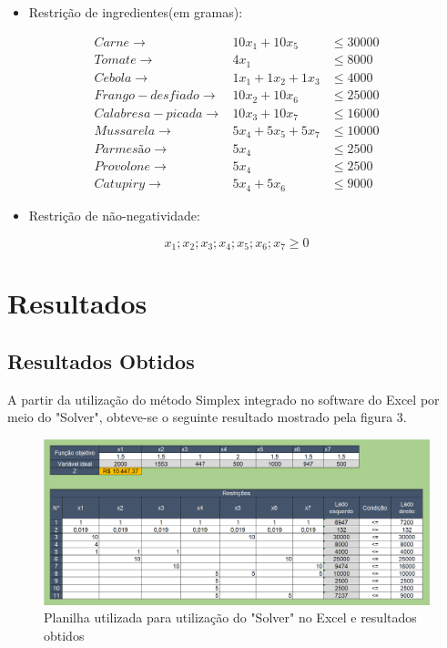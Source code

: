 \documentclass[
	12pt,				%
	openright,			%
	oneside,			%
	a4paper,			%
	english,			%
	french,				%
	spanish,			%
	brazil				%
	]{abntex2}
\begin{document}
\begin{itemize}
\item Restrição de ingredientes(em gramas):
\end{itemize}
\begin{eqnarray}
Carne \to & 10x_1 + 10x_5 & \leq 30000\\
Tomate \to &  4x_1 & \leq 8000\\
Cebola \to & 1x_1 + 1x_2 + 1x_3 & \leq 4000\\
Frango-desfiado \to & 10x_2 + 10x_6 & \leq 25000\\
Calabresa-picada \to & 10x_3 + 10x_7 & \leq 16000\\
Mussarela \to & 5x_4 + 5x_5 + 5x_7 & \leq 10000 \\
Parmesão \to & 5x_4 & \leq 2500\\
Provolone \to & 5x_4 & \leq 2500\\
Catupiry \to & 5x_4 + 5x_6 & \leq 9000
\end{eqnarray}

\begin{itemize}
\item Restrição de não-negatividade:
\end{itemize}
\begin{equation}
x_1 ; x_2 ; x_3 ; x_4 ; x_5 ; x_6 ; x_7 \geq 0
\end{equation}

\part{Resultados}

\chapter{Resultados Obtidos}

A partir da utilização do método Simplex integrado no software do Excel por meio do "Solver", obteve-se o seguinte resultado mostrado pela figura 3. 

\begin{figure}[htb] \centering \label{figura3}
\caption{Planilha utilizada para utilização do "Solver" no Excel e resultados obtidos}
\includegraphics[scale=0.47]{imagens_suporte/results.png} 
\end{figure}
\end{document}
